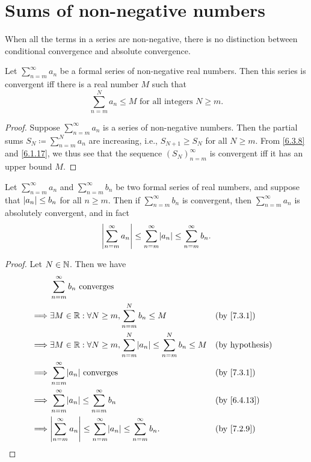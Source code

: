 \section{Sums of non-negative numbers}\label{sec:7.3}

\begin{note}
  When all the terms in a series are non-negative, there is no distinction between conditional convergence and absolute convergence.
\end{note}

\begin{prop}\label{7.3.1}
  Let \(\sum_{n = m}^\infty a_n\) be a formal series of non-negative real numbers.
  Then this series is convergent iff there is a real number \(M\) such that
  \[
    \sum_{n = m}^N a_n \leq M \text{ for all integers } N \geq m.
  \]
\end{prop}

\begin{proof}
  Suppose \(\sum_{n = m}^\infty a_n\) is a series of non-negative numbers.
  Then the partial sums \(S_N \coloneqq \sum_{n = m}^N a_n\) are increasing, i.e., \(S_{N + 1} \geq S_N\) for all \(N \geq m\).
  From \cref{6.3.8} and \cref{6.1.17}, we thus see that the sequence \((S_N)_{n = m}^\infty\) is convergent iff it has an upper bound \(M\).
\end{proof}

\begin{cor}\label{7.3.2}
  Let \(\sum_{n = m}^\infty a_n\) and \(\sum_{n = m}^\infty b_n\) be two formal series of real numbers, and suppose that \(\left\lvert a_n\right\rvert \leq b_n\) for all \(n \geq m\).
  Then if \(\sum_{n = m}^\infty b_n\) is convergent, then \(\sum_{n = m}^\infty a_n\) is absolutely convergent, and in fact
  \[
    \abs{\sum_{n = m}^\infty a_n} \leq \sum_{n = m}^\infty \abs{a_n} \leq \sum_{n = m}^\infty b_n.
  \]
\end{cor}

\begin{proof}
  Let \(N \in \mathbb{N}\).
  Then we have
  \begin{align*}
             & \sum_{n = m}^\infty b_n \text{ converges}                                                                                  \\
    \implies & \exists M \in \R : \forall N \geq m, \sum_{n = m}^N b_n \leq M                                 &  & \by{7.3.1}             \\
    \implies & \exists M \in \R : \forall N \geq m, \sum_{n = m}^N \abs{a_n} \leq \sum_{n = m}^N b_n \leq M   &  & \text{(by hypothesis)} \\
    \implies & \sum_{n = m}^\infty \abs{a_n} \text{ converges}                                                &  & \by{7.3.1}             \\
    \implies & \sum_{n = m}^\infty \abs{a_n} \leq \sum_{n = m}^\infty b_n                                     &  & \by{6.4.13}            \\
    \implies & \abs{\sum_{n = m}^\infty a_n} \leq \sum_{n = m}^\infty \abs{a_n} \leq \sum_{n = m}^\infty b_n. &  & \by{7.2.9}
  \end{align*}
\end{proof}

